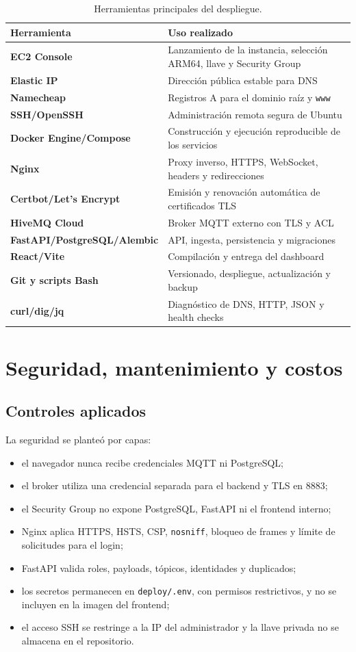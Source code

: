 \documentclass[12pt,a4paper,oneside]{report}
\newcommand{\code}[1]{\texttt{\small #1}}
\begin{document}
\begin{table}[ht]
\centering
\small
\begin{tabularx}{\textwidth}{>{\bfseries}l X}
\toprule
Herramienta & Uso realizado \\
\midrule
EC2 Console & Lanzamiento de la instancia, selección ARM64, llave y Security Group \\
Elastic IP & Dirección pública estable para DNS \\
Namecheap & Registros A para el dominio raíz y \code{www} \\
SSH/OpenSSH & Administración remota segura de Ubuntu \\
Docker Engine/Compose & Construcción y ejecución reproducible de los servicios \\
Nginx & Proxy inverso, HTTPS, WebSocket, headers y redirecciones \\
Certbot/Let's Encrypt & Emisión y renovación automática de certificados TLS \\
HiveMQ Cloud & Broker MQTT externo con TLS y ACL \\
FastAPI/PostgreSQL/Alembic & API, ingesta, persistencia y migraciones \\
React/Vite & Compilación y entrega del dashboard \\
Git y scripts Bash & Versionado, despliegue, actualización y backup \\
curl/dig/jq & Diagnóstico de DNS, HTTP, JSON y health checks \\
\bottomrule
\end{tabularx}
\caption{Herramientas principales del despliegue.}
\end{table}

\chapter{Seguridad, mantenimiento y costos}

\section{Controles aplicados}

La seguridad se planteó por capas:

\begin{itemize}
  \item el navegador nunca recibe credenciales MQTT ni PostgreSQL;
  \item el broker utiliza una credencial separada para el backend y TLS en 8883;
  \item el Security Group no expone PostgreSQL, FastAPI ni el frontend interno;
  \item Nginx aplica HTTPS, HSTS, CSP, \code{nosniff}, bloqueo de frames y límite
        de solicitudes para el login;
  \item FastAPI valida roles, payloads, tópicos, identidades y duplicados;
  \item los secretos permanecen en \code{deploy/.env}, con permisos restrictivos,
        y no se incluyen en la imagen del frontend;
  \item el acceso SSH se restringe a la IP del administrador y la llave privada
        no se almacena en el repositorio.
\end{itemize}
\end{document}
